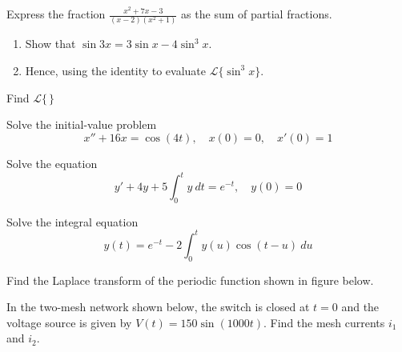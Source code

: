 \begin{mdframed}
    \vspace{-0.25cm}
    \hspace{-0.25cm}
    \begin{Exercise}
        Express the fraction $\displaystyle \frac{x^2 + 7x - 3}{(x-2)(x^2 + 1)}$ as the sum of partial fractions.
    \end{Exercise}

    \begin{Exercise}
        \begin{enumerate}
            \item Show that $\sin 3x = 3 \sin x - 4\sin^3x$.
            \item Hence, using the identity to evaluate $\mathcal{L}\{\sin^3 x\}$.
        \end{enumerate}
    \end{Exercise}

    \begin{Exercise}
        Find $\displaystyle \mathcal{L} \biggl\{\frac{}{}\biggr\}$
    \end{Exercise}

    \begin{Exercise}
        Solve the initial-value problem
        \[
            x'' + 16x = \cos(4t),\quad x(0) = 0,\quad x'(0) =1
        \]
    \end{Exercise}

    \begin{Exercise}
        Solve the equation
        \[
            y' + 4y + 5\int_{0}^{t} y \> dt = e^{-t}, \quad y(0) = 0
        \]
    \end{Exercise}

    \begin{Exercise}
        Solve the integral equation
        \[
            y(t) = e^{-t} - 2\int_{0}^{t} y(u) \cos(t-u) \> du
        \]
    \end{Exercise}

    \begin{Exercise}
        Find the Laplace transform of the periodic function shown in figure below.

        
    \end{Exercise}

    \begin{Exercise}
        In the two-mesh network shown below, the switch is closed at $t = 0$ and the voltage source is given by
    $V(t) = 150 \sin(1000t)$. Find the mesh currents $i_1$ and $i_2$.


\end{Exercise}
\end{mdframed}
